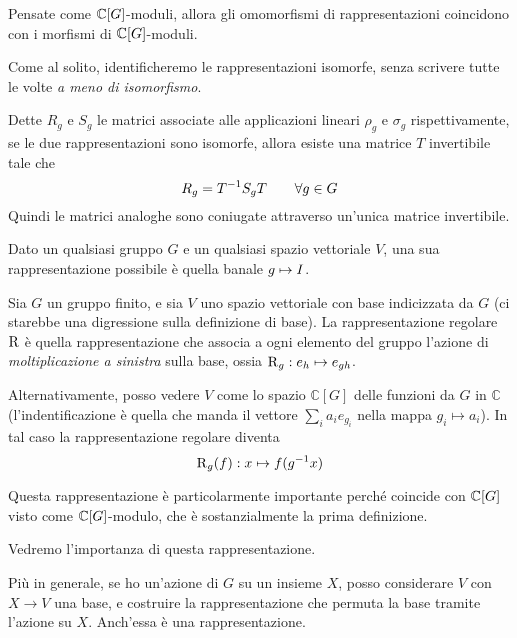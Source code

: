     Pensate come $\mathbb C[G]$-moduli, allora gli omomorfismi di rappresentazioni coincidono con i morfismi di $\mathbb C[G]$-moduli.
    
    Come al solito, identificheremo le rappresentazioni isomorfe, senza scrivere tutte le volte \emph{a meno di isomorfismo}.
    
    Dette $R_g$ e $S_g$ le matrici associate alle applicazioni lineari $\rho_g$ e $\sigma_g$ rispettivamente, se le due rappresentazioni sono isomorfe, allora esiste una matrice $T$ invertibile tale che
    \[
     R_g = T^{-1} S_g T \qquad \forall g\in G
    \]
    Quindi le matrici analoghe sono coniugate attraverso un'unica matrice invertibile.
        
    \begin{myexample}
     Dato un qualsiasi gruppo $G$ e un qualsiasi spazio vettoriale $V$, una sua rappresentazione possibile è quella banale $g \mapsto I$.
    \end{myexample}
    \begin{myexample}
     Sia $G$ un gruppo finito, e sia $V$ uno spazio vettoriale con base indicizzata da $G$ (ci starebbe una digressione sulla definizione di base). La rappresentazione regolare $\operatorname{R}$ è quella rappresentazione che associa a ogni elemento del gruppo l'azione di \emph{moltiplicazione a sinistra} sulla base, ossia $\operatorname{R}_g: e_h \mapsto e_{gh}$.
     
     Alternativamente, posso vedere $V$ come lo spazio $\mathbb C[G]$ delle funzioni da $G$ in $\mathbb C$ (l'indentificazione è quella che manda il vettore $\sum_i a_ie_{g_i}$ nella mappa $g_i \mapsto a_i$). In tal caso la rappresentazione regolare diventa
     \[
     \operatorname{R}_g(f): x \mapsto  f ( g^{-1} x) 
     \]
     
     Questa rappresentazione è particolarmente importante perché coincide con $\mathbb C[G]$ visto come $\mathbb C[G]$-modulo, che è sostanzialmente la prima definizione.
     
     Vedremo l'importanza di questa rappresentazione.
     \end{myexample}
     \begin{myexample}
      Più in generale, se ho un'azione di $G$ su un insieme $X$, posso considerare $V$ con $X\rightarrow V$ una base, e costruire la rappresentazione che permuta la base tramite l'azione su $X$. Anch'essa è una rappresentazione.
    \end{myexample}
  
